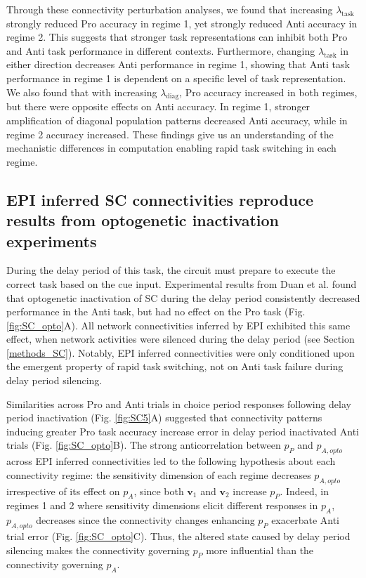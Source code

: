 \documentclass[11pt]{article}
\begin{document}
Through these connectivity perturbation analyses, we found that increasing $\lambda_{\text{task}}$ strongly reduced Pro accuracy in regime 1, yet strongly reduced Anti accuracy in regime 2.
This suggests that stronger task representations can inhibit both Pro and Anti task performance in different contexts.
Furthermore, changing $\lambda_{\text{task}}$ in either direction decreases Anti performance in regime 1, showing that Anti task performance in regime 1 is dependent on a specific level of task representation.
We also found that with increasing $\lambda_{\text{diag}}$, Pro accuracy increased in both regimes, but there were opposite effects on Anti accuracy.
In regime 1, stronger amplification of diagonal population patterns decreased Anti accuracy, while in regime 2 accuracy increased.
These findings give us an understanding of the mechanistic differences in computation enabling rapid task switching in each regime.

\subsection{EPI inferred SC connectivities reproduce results from optogenetic inactivation experiments} \label{results_SC}

During the delay period of this task, the circuit must prepare to execute the correct task based on the cue input.
Experimental results from Duan et al. found that optogenetic inactivation of SC during the delay period consistently decreased performance in the Anti task, but had no effect on the Pro task (Fig. \ref{fig:SC_opto}A).
All network connectivities inferred by EPI exhibited this same effect, when network activities were silenced during the delay period (see Section \ref{methods_SC}).
Notably, EPI inferred connectivities were only conditioned upon the emergent property of rapid task switching, not on Anti task failure during delay period silencing.

Similarities across Pro and Anti trials in choice period responses following delay period inactivation (Fig. \ref{fig:SC5}A) suggested that connectivity patterns inducing greater Pro task accuracy increase error in delay period inactivated Anti trials (Fig. \ref{fig:SC_opto}B).
The strong anticorrelation between $p_P$ and $p_{A, opto}$ across EPI inferred connectivities led to the following hypothesis about each connectivity regime: the sensitivity dimension of each regime decreases $p_{A,opto}$ irrespective of its effect on $p_A$, since both $\mathbf{v}_1$ and $\mathbf{v}_2$ increase $p_P$.
Indeed, in regimes 1 and 2 where sensitivity dimensions elicit different responses in $p_A$, $p_{A,opto}$ decreases since the connectivity changes enhancing $p_P$ exacerbate Anti trial error (Fig. \ref{fig:SC_opto}C).
Thus, the altered state caused by delay period silencing makes the connectivity governing $p_P$ more influential than the connectivity governing $p_A$.
\end{document}
